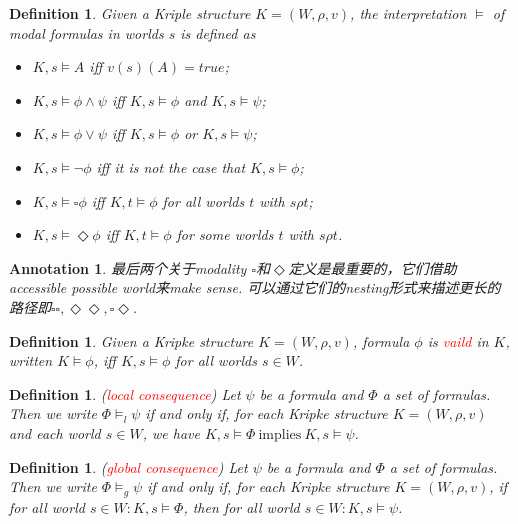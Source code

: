 \documentclass{article}
\theoremstyle{plain}
\newtheorem{definition}[theorem]{Definition}
\newtheorem{annotation}[theorem]{Annotation}
\theoremstyle{nonumberplain}
\newcommand{\redt}[1]{\textcolor{red}{#1}}
\begin{document}
\begin{definition}
\rm Given a Kriple structure $K=(W, \rho, v)$, the interpretation  $\vDash$ of modal formulas in worlds $s$ is defined as
\begin{itemize}
	\item $K, s \vDash A$ iff $v(s)(A) = true$;
	\item $K, s \vDash \phi \wedge \psi$ iff $K, s \vDash \phi$ and $K, s \vDash \psi$;
	\item $K, s \vDash \phi \vee \psi$ iff $K, s \vDash \phi$ or $K, s \vDash \psi$;
	\item $K, s \vDash \neg \phi$ iff it is not the case that $K, s \vDash \phi$;
	\item $K, s \vDash \square \phi$ iff $K, t \vDash \phi$ for all worlds $t$ with $s \rho t$;
	\item $K, s \vDash \Diamond \phi$ iff $K, t \vDash \phi$ for some worlds $t$ with $s \rho t$.
\end{itemize}
\end{definition}

\begin{annotation}
\rm 最后两个关于modality $\square$和$\Diamond$定义是最重要的，它们借助accessible possible world来make sense. 可以通过它们的nesting形式来描述更长的路径即$\square\square,\Diamond\Diamond,\square\Diamond$. 
\end{annotation}

\begin{definition}
\rm Given a Kripke structure $K = (W,\rho, v)$, formula $\phi$ is \redt{vaild} in $K$, written $K \vDash \phi$, iff $K,s \vDash \phi$ for all worlds $s \in W$.
\end{definition}

\begin{definition}
\rm (\redt{local consequence}) Let $\psi$ be a formula and $\Phi$ a set of formulas. Then we write $\Phi \vDash_l \psi$ if and only if, for each Kripke structure $K = (W, \rho, v)$ and each world $s \in W$, we have $K, s \vDash \Phi~\text{implies}~K,s \vDash \psi$.  
\end{definition}

\begin{definition}
\rm (\redt{global consequence}) Let $\psi$ be a formula and $\Phi$ a set of formulas. Then we write $\Phi \vDash_g \psi$ if and only if, for each Kripke structure $K = (W, \rho, v)$, if for all world $s \in W:K, s \vDash \Phi$, then for all world $s \in W: K,s \vDash \psi$.
\end{definition}
\end{document}
